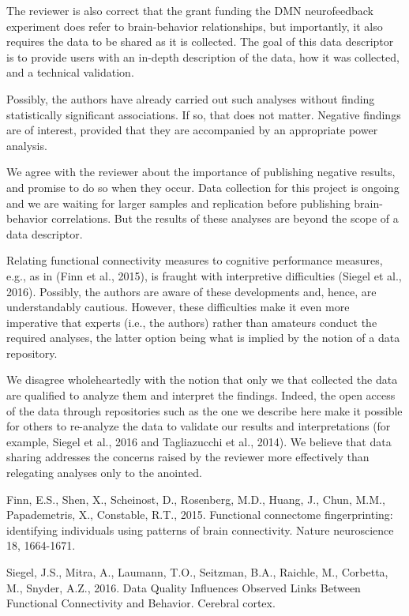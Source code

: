 \documentclass{article}
\newcommand{\RESPONSE}[1]{\textcolor{responseblue}{#1}}
\begin{document}
\RESPONSE{The reviewer is also correct that the grant funding the DMN neurofeedback experiment does refer to brain-behavior relationships, but importantly, it also requires the data to be shared as it is collected. The goal of this data descriptor is to provide users with an in-depth description of the data, how it was collected, and a technical validation. }

Possibly, the authors have already carried out such analyses without finding statistically significant associations. If so, that does not matter. Negative findings are of interest, provided that they are accompanied by an appropriate power analysis. 

\RESPONSE{We agree with the reviewer about the importance of publishing negative results, and promise to do so when they occur. Data collection for this project is ongoing and we are waiting for larger samples and replication before publishing brain-behavior correlations. But the results of these analyses are beyond the scope of a data descriptor.}

Relating functional connectivity measures to cognitive performance measures, e.g., as in (Finn et al., 2015), is fraught with interpretive difficulties (Siegel et al., 2016). Possibly, the authors are aware of these developments and, hence, are understandably cautious. However, these difficulties make it even more imperative that experts (i.e., the authors) rather than amateurs conduct the required analyses, the latter option being what is implied by the notion of a data repository.

\RESPONSE{We disagree wholeheartedly with the notion that only we that collected the data are qualified to analyze them and interpret the findings. Indeed, the open access of the data through repositories such as the one we describe here make it possible for others to re-analyze the data to validate our results and interpretations (for example, Siegel et al., 2016 and Tagliazucchi et al., 2014). We believe that data sharing addresses the concerns raised by the reviewer more effectively than relegating analyses only to the anointed.}

Finn, E.S., Shen, X., Scheinost, D., Rosenberg, M.D., Huang, J., Chun, M.M., Papademetris, X., Constable, R.T., 2015. Functional connectome fingerprinting: identifying individuals using patterns of brain connectivity. Nature neuroscience 18, 1664-1671.

Siegel, J.S., Mitra, A., Laumann, T.O., Seitzman, B.A., Raichle, M., Corbetta, M., Snyder, A.Z., 2016. Data Quality Influences Observed Links Between Functional Connectivity and Behavior. Cerebral cortex.
\end{document}
